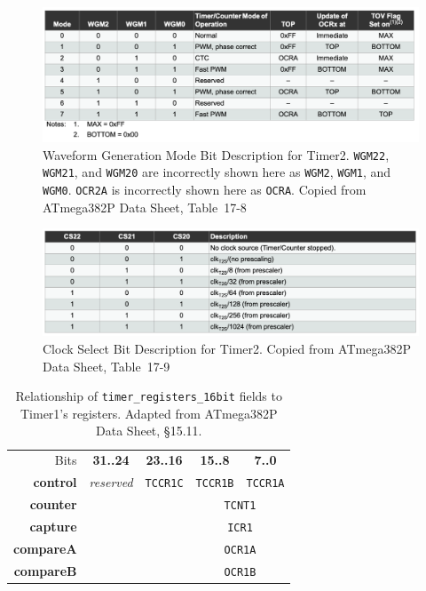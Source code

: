 \begin{figure}
    \centering
    \includegraphics[width=15cm]{WGM-Timer2}
    \caption{Waveform Generation Mode Bit Description for Timer2. \texttt{WGM22}, \texttt{WGM21}, and \texttt{WGM20} are incorrectly shown here as \texttt{WGM2}, \texttt{WGM1}, and \texttt{WGM0}. \texttt{OCR2A} is incorrectly shown here as \texttt{OCRA}. \tiny Copied from ATmega382P Data Sheet, Table~17-8 \label{fig:Timer2WGM}}
\end{figure}

\begin{figure}
    \centering
    \includegraphics[width=15cm]{CS-Timer2}
    \caption{Clock Select Bit Description for Timer2. \tiny Copied from ATmega382P Data Sheet, Table~17-9 \label{fig:Timer2CS}}
\end{figure}

\begin{table}
    \centering \small
    \begin{tabular}{|r||c|c|c|c||}
        \hline
        Bits                & \textbf{31..24}   & \textbf{23..16}   & \textbf{15..8}    & \textbf{7..0}     \\ \cline{2-5}
        \textbf{control}    & \textit{reserved} & \texttt{TCCR1C}   & \texttt{TCCR1B}   & \texttt{TCCR1A}   \\
        \textbf{counter}    & \multicolumn{2}{c|}{}                 & \multicolumn{2}{c||}{\texttt{TCNT1}}  \\
        \textbf{capture}    & \multicolumn{2}{c|}{}                 & \multicolumn{2}{c||}{\texttt{ICR1}}   \\
        \textbf{compareA}   & \multicolumn{2}{c|}{}                 & \multicolumn{2}{c||}{\texttt{OCR1A}}  \\
        \textbf{compareB}   & \multicolumn{2}{c|}{}                 & \multicolumn{2}{c||}{\texttt{OCR1B}}  \\ \hline
    \end{tabular}
    \caption{Relationship of \lstinline{timer_registers_16bit} fields to Timer1's registers. \tiny Adapted from ATmega382P Data Sheet, §15.11. \label{table:Timer1Registers}}
\end{table}

